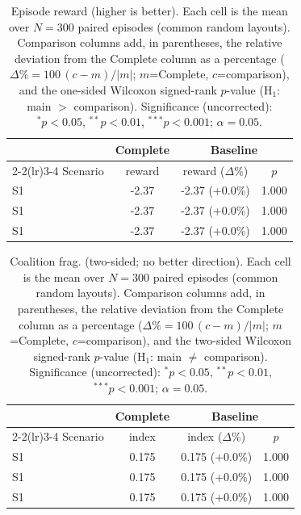 \begin{table}[ht]
  \centering
  \caption{Episode reward (higher is better). Each cell is the mean over $N=300$ paired episodes (common random layouts). Comparison columns add, in parentheses, the relative deviation from the Complete column as a percentage ($\Delta\%=100\,(c-m)/|m|$; $m$=Complete, $c$=comparison), and the one-sided Wilcoxon signed-rank $p$-value (H$_1$: main $>$ comparison). Significance (uncorrected): $^{*}p<0.05$, $^{**}p<0.01$, $^{***}p<0.001$; $\alpha=0.05$.}
  \label{tab:wilcoxon-reward}
  \small
  \begin{tabular}{l c cc}
    \toprule
     & Complete & \multicolumn{2}{c}{Baseline} \\
    \cmidrule(lr){2-2}\cmidrule(lr){3-4}
    Scenario & {reward} & {reward ($\Delta$\%)} & {$p$} \\
    \midrule
    S1 & -2.37 & -2.37 (+0.0\%) & 1.000 \\
    S1 & -2.37 & -2.37 (+0.0\%) & 1.000 \\
    S1 & -2.37 & -2.37 (+0.0\%) & 1.000 \\
    \bottomrule
  \end{tabular}
\end{table}

\begin{table}[ht]
  \centering
  \caption{Coalition frag. (two-sided; no better direction). Each cell is the mean over $N=300$ paired episodes (common random layouts). Comparison columns add, in parentheses, the relative deviation from the Complete column as a percentage ($\Delta\%=100\,(c-m)/|m|$; $m$=Complete, $c$=comparison), and the two-sided Wilcoxon signed-rank $p$-value (H$_1$: main $\neq$ comparison). Significance (uncorrected): $^{*}p<0.05$, $^{**}p<0.01$, $^{***}p<0.001$; $\alpha=0.05$.}
  \label{tab:wilcoxon-fragmentation}
  \small
  \begin{tabular}{l c cc}
    \toprule
     & Complete & \multicolumn{2}{c}{Baseline} \\
    \cmidrule(lr){2-2}\cmidrule(lr){3-4}
    Scenario & {index} & {index ($\Delta$\%)} & {$p$} \\
    \midrule
    S1 & 0.175 & 0.175 (+0.0\%) & 1.000 \\
    S1 & 0.175 & 0.175 (+0.0\%) & 1.000 \\
    S1 & 0.175 & 0.175 (+0.0\%) & 1.000 \\
    \bottomrule
  \end{tabular}
\end{table}
